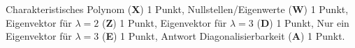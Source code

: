 \begin{bewertung}
Charakteristisches Polynom ({\bf X}) 1 Punkt,
Nullstellen/Eigenwerte ({\bf W}) 1 Punkt,
Eigenvektor für $\lambda=2$ ({\bf Z}) 1 Punkt,
Eigenvektor für $\lambda=3$ ({\bf D}) 1 Punkt,
Nur ein Eigenvektor für $\lambda=3$ ({\bf E}) 1 Punkt,
Antwort Diagonalisierbarkeit ({\bf A}) 1 Punkt.
\end{bewertung}
